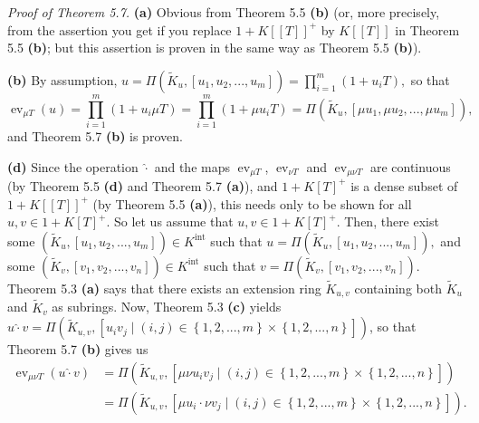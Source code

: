 \documentclass[numbers=enddot,12pt,final,onecolumn,notitlepage]{scrartcl}%
\begin{document}
\textit{Proof of Theorem 5.7.} \textbf{(a)} Obvious from Theorem 5.5
\textbf{(b)} (or, more precisely, from the assertion you get if you replace
$1+K\left[  \left[  T\right]  \right]  ^{+}$ by $K\left[  \left[  T\right]
\right]  $ in Theorem 5.5 \textbf{(b)}; but this assertion is proven in the
same way as Theorem 5.5 \textbf{(b)}).

\textbf{(b)} By assumption, $u=\Pi\left(  \widetilde{K}_{u},\left[
u_{1},u_{2},...,u_{m}\right]  \right)  =\prod\limits_{i=1}^{m}\left(
1+u_{i}T\right)  ,$ so that%
\[
\operatorname{ev}_{\mu T}\left(  u\right)  =\prod\limits_{i=1}^{m}\left(
1+u_{i}\mu T\right)  =\prod\limits_{i=1}^{m}\left(  1+\mu u_{i}T\right)
=\Pi\left(  \widetilde{K}_{u},\left[  \mu u_{1},\mu u_{2},...,\mu
u_{m}\right]  \right)  ,
\]
and Theorem 5.7 \textbf{(b)} is proven.

\textbf{(d)} Since the operation $\widehat{\cdot}$ and the maps
$\operatorname*{ev}_{\mu T}$, $\operatorname*{ev}_{\nu T}$ and
$\operatorname*{ev}_{\mu\nu T}$ are continuous (by Theorem 5.5 \textbf{(d)
}and Theorem 5.7 \textbf{(a)}), and $1+K\left[  T\right]  ^{+}$ is a dense
subset of $1+K\left[  \left[  T\right]  \right]  ^{+}$ (by Theorem 5.5
\textbf{(a)}), this needs only to be shown for all $u,v\in1+K\left[  T\right]
^{+}$. So let us assume that $u,v\in1+K\left[  T\right]  ^{+}$. Then, there
exist some $\left(  \widetilde{K}_{u},\left[  u_{1},u_{2},...,u_{m}\right]
\right)  \in K^{\operatorname*{int}}$ such that $u=\Pi\left(  \widetilde{K}%
_{u},\left[  u_{1},u_{2},...,u_{m}\right]  \right)  ,$ and some $\left(
\widetilde{K}_{v},\left[  v_{1},v_{2},...,v_{n}\right]  \right)  \in
K^{\operatorname*{int}}$ such that $v=\Pi\left(  \widetilde{K}_{v},\left[
v_{1},v_{2},...,v_{n}\right]  \right)  $. Theorem 5.3 \textbf{(a)} says that
there exists an extension ring $\widetilde{K}_{u,v}$ containing both
$\widetilde{K}_{u}$ and $\widetilde{K}_{v}$ as subrings. Now, Theorem 5.3
\textbf{(c)} yields $u\widehat{\cdot}v=\Pi\left(  \widetilde{K}_{u,v},\left[
u_{i}v_{j}\mid\left(  i,j\right)  \in\left\{  1,2,...,m\right\}
\times\left\{  1,2,...,n\right\}  \right]  \right)  $, so that Theorem 5.7
\textbf{(b)} gives us%
\begin{align*}
\operatorname*{ev}\nolimits_{\mu\nu T}\left(  u\widehat{\cdot}v\right)   &
=\Pi\left(  \widetilde{K}_{u,v},\left[  \mu\nu u_{i}v_{j}\mid\left(
i,j\right)  \in\left\{  1,2,...,m\right\}  \times\left\{  1,2,...,n\right\}
\right]  \right) \\
&  =\Pi\left(  \widetilde{K}_{u,v},\left[  \mu u_{i}\cdot\nu v_{j}\mid\left(
i,j\right)  \in\left\{  1,2,...,m\right\}  \times\left\{  1,2,...,n\right\}
\right]  \right)  .
\end{align*}
\end{document}
